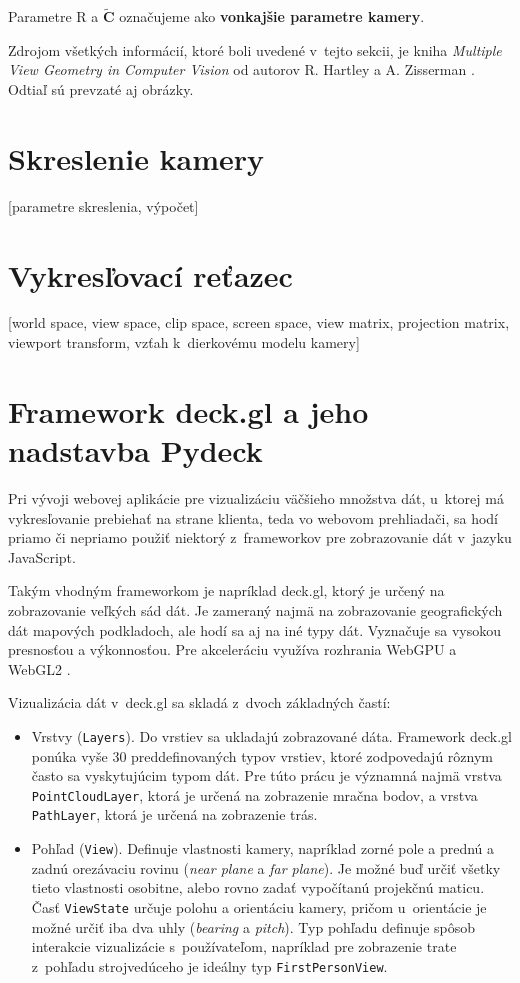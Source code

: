 Parametre $\mathrm{R}$ a $\widetilde{\mathbf{C}}$ označujeme ako \textbf{vonkajšie parametre kamery}.

Zdrojom všetkých informácií, ktoré boli uvedené v~tejto sekcii, je kniha \emph{Multiple View Geometry in Computer Vision} od autorov R. Hartley a A. Zisserman \cite{multiple_view_geometry}. Odtiaľ sú prevzaté aj obrázky.

\section{Skreslenie kamery}

[parametre skreslenia, výpočet]

\section{Vykresľovací reťazec}

[world space, view space, clip space, screen space, view matrix, projection matrix, viewport transform, vzťah k~dierkovému modelu kamery]


\section{Framework deck.gl a jeho nadstavba Pydeck}
\label{sec:deck_gl}

Pri vývoji webovej aplikácie pre vizualizáciu väčšieho množstva dát, u~ktorej má vykresľovanie prebiehať na strane klienta, teda vo webovom prehliadači, sa hodí priamo či nepriamo použiť niektorý z~frameworkov pre zobrazovanie dát v~jazyku JavaScript.

Takým vhodným frameworkom je napríklad deck.gl, ktorý je určený na zobrazovanie veľkých sád dát. Je zameraný najmä na zobrazovanie geografických dát mapových podkladoch, ale hodí sa aj na iné typy dát. Vyznačuje sa vysokou presnosťou a výkonnosťou. Pre akceleráciu využíva rozhrania WebGPU a WebGL2 \cite{deck.gl_documentation}.

Vizualizácia dát v~deck.gl sa skladá z~dvoch základných častí:
\begin{itemize}
    \item Vrstvy (\texttt{Layers}). Do vrstiev sa ukladajú zobrazované dáta. Framework deck.gl ponúka vyše 30 preddefinovaných typov vrstiev, ktoré zodpovedajú rôznym často sa vyskytujúcim typom dát. Pre túto prácu je významná najmä vrstva \texttt{PointCloudLayer}, ktorá je určená na zobrazenie mračna bodov, a vrstva \texttt{PathLayer}, ktorá je určená na zobrazenie trás.
    \item Pohľad (\texttt{View}). Definuje vlastnosti kamery, napríklad zorné pole a prednú a zadnú orezávaciu rovinu (\emph{near plane} a \emph{far plane}). Je možné buď určiť všetky tieto vlastnosti osobitne, alebo rovno zadať vypočítanú projekčnú maticu.
    Časť \texttt{ViewState} určuje polohu a orientáciu kamery, pričom u~orientácie je možné určiť iba dva uhly (\emph{bearing} a \emph{pitch}). Typ pohľadu definuje spôsob interakcie vizualizácie s~používateľom, napríklad pre zobrazenie trate z~pohľadu strojvedúceho je ideálny typ \texttt{FirstPersonView}.
\end{itemize}

